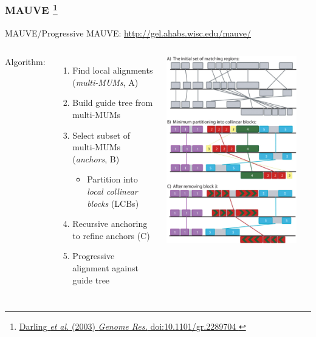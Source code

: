 %
\begin{frame}
  \frametitle{MAUVE
  \footnote{\tiny{\href{http://dx.doi.org/10.1101/gr.2289704
}{Darling \textit{et al.} (2003) \textit{Genome Res.} doi:10.1101/gr.2289704
}}}
  }
  MAUVE/Progressive MAUVE: \href{http://gel.ahabs.wisc.edu/mauve/}{http://gel.ahabs.wisc.edu/mauve/} \\
  \begin{columns}[T] 
      \textcolor{RawSienna}{Algorithm:}
      \begin{enumerate}
        \item \textcolor{hutton_green}{Find local alignments (\textit{multi-MUMs}, A)}
        \item Build guide tree from multi-MUMs
        \item \textcolor{hutton_blue}{Select subset of multi-MUMs (\textit{anchors}, B)}
        \begin{itemize}
          \item Partition into \textit{local collinear blocks} (LCBs)
        \end{itemize}
        \item \textcolor{hutton_purple}{Recursive anchoring to refine anchors (C)}
        \item Progressive alignment against guide tree
      \end{enumerate}
      \includegraphics[width=0.9\textwidth]{images/mauve_method}
  \end{columns}    
\end{frame}

